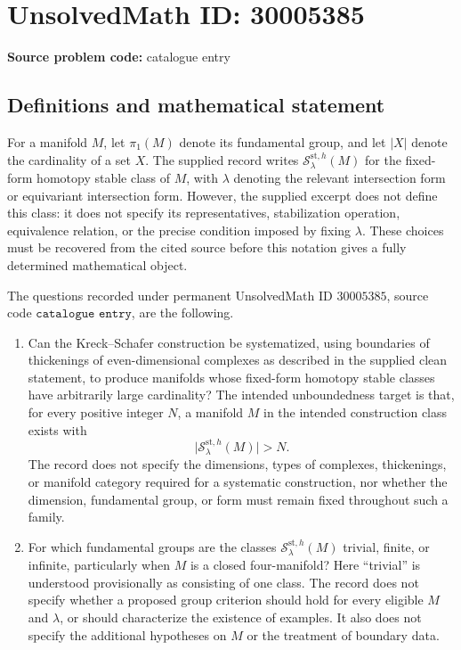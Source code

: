 \documentclass[11pt]{article}
\begin{document}
\section*{UnsolvedMath ID: 30005385}
\textbf{Source problem code:} catalogue entry
\subsection{Definitions and mathematical statement}
For a manifold \(M\), let \(\pi_1(M)\) denote its fundamental group, and let \(|X|\) denote the cardinality of a set \(X\). The supplied record writes \(\mathcal S_{\lambda}^{\mathrm{st},h}(M)\) for the fixed-form homotopy stable class of \(M\), with \(\lambda\) denoting the relevant intersection form or equivariant intersection form. However, the supplied excerpt does not define this class: it does not specify its representatives, stabilization operation, equivalence relation, or the precise condition imposed by fixing \(\lambda\). These choices must be recovered from the cited source before this notation gives a fully determined mathematical object.

The questions recorded under permanent UnsolvedMath ID \(30005385\), source code \(\texttt{catalogue entry}\), are the following.
\begin{enumerate}
\item Can the Kreck--Schafer construction be systematized, using boundaries of thickenings of even-dimensional complexes as described in the supplied clean statement, to produce manifolds whose fixed-form homotopy stable classes have arbitrarily large cardinality? The intended unboundedness target is that, for every positive integer \(N\), a manifold \(M\) in the intended construction class exists with
\[
\bigl|\mathcal S_{\lambda}^{\mathrm{st},h}(M)\bigr|>N.
\]
The record does not specify the dimensions, types of complexes, thickenings, or manifold category required for a systematic construction, nor whether the dimension, fundamental group, or form must remain fixed throughout such a family.
\item For which fundamental groups are the classes \(\mathcal S_{\lambda}^{\mathrm{st},h}(M)\) trivial, finite, or infinite, particularly when \(M\) is a closed four-manifold? Here ``trivial'' is understood provisionally as consisting of one class. The record does not specify whether a proposed group criterion should hold for every eligible \(M\) and \(\lambda\), or should characterize the existence of examples. It also does not specify the additional hypotheses on \(M\) or the treatment of boundary data.
\end{enumerate}
\end{document}
